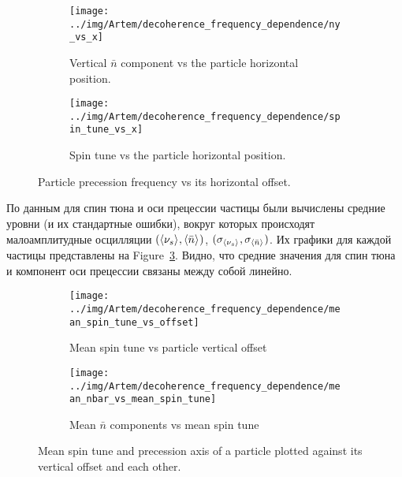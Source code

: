 \documentclass{report}
\begin{document}
\begin{figure}[H]
  \centering
  \begin{subfigure}[b]{\textwidth}
    \texttt{[image: ../img/Artem/decoherence\_frequency\_dependence/ny\_vs\_x]}
    \caption{Vertical $\bar n$ component vs the particle horizontal position.}
  \end{subfigure}

  \begin{subfigure}[b]{\textwidth}
    \texttt{[image: ../img/Artem/decoherence\_frequency\_dependence/spin\_tune\_vs\_x]}
    \caption{Spin tune vs the particle horizontal position.}
  \end{subfigure}
  \caption{Particle precession frequency vs its horizontal offset.\label{fig:tune_axis_position_x}}
\end{figure}

По данным для спин тюна и оси прецессии частицы были вычислены средние уровни (и их стандартные ошибки), вокруг которых происходят малоамплитудные осцилляции $(\avg{\nu_s}, \avg{\bar n})$, $(\sigma_{\avg{\nu_s}}, \sigma_{\avg{\bar n}})$. Их графики для каждой частицы представлены на Figure~\ref{fig:mean_tune_axis}. Видно, что средние значения для спин тюна и компонент оси прецессии связаны между собой линейно.

\begin{figure}[H]
  \centering
  \begin{subfigure}[b]{\textwidth}
    \texttt{[image: ../img/Artem/decoherence\_frequency\_dependence/mean\_spin\_tune\_vs\_offset]}
    \caption{Mean spin tune vs particle vertical offset\label{fig:mean_tune_axis}}
  \end{subfigure}

  \begin{subfigure}[b]{\textwidth}
    \texttt{[image: ../img/Artem/decoherence\_frequency\_dependence/mean\_nbar\_vs\_mean\_spin\_tune]}
    \caption{Mean $\bar n$ components vs mean spin tune}
  \end{subfigure}
  \caption{Mean spin tune and precession axis of a particle plotted against its vertical offset and each other.\label{fig:mean_tune_axis}}
\end{figure}
\end{document}
